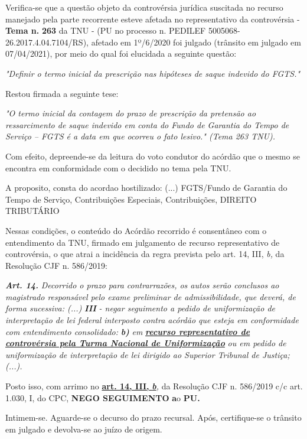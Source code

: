 \documentclass[12pt]{article}
\begin{document}
\justifying
\noindent Verifica-se que a questão objeto da controvérsia jurídica suscitada no recurso manejado pela parte recorrente esteve afetada no representativo da controvérsia - \textbf{Tema n. }\textbf{263} da TNU - (PU no processo n. PEDILEF 5005068-26.2017.4.04.7104/RS),  afetado em 1º/6/2020 foi julgado (trânsito em julgado em 07/04/2021), por meio do qual foi elucidada a seguinte questão:

\noindent \textit{"Definir o termo inicial da prescrição nas hipóteses de saque indevido do FGTS."}

\noindent Restou firmada a seguinte tese:

\noindent \textit{"O termo inicial da contagem do prazo de prescrição da pretensão ao ressarcimento de saque indevido em conta do Fundo de Garantia do Tempo de Serviço – FGTS é a data em que ocorreu o fato lesivo." (Tema 263 TNU).}

\noindent Com efeito, depreende-se da leitura do voto condutor do acórdão que o mesmo se encontra em conformidade com o decidido no  tema pela TNU.

\noindent A proposito, consta do acordao hostilizado: (...) FGTS/Fundo de Garantia do Tempo de Serviço, Contribuições Especiais, Contribuições, DIREITO TRIBUTÁRIO

\noindent Nessas condições, o conteúdo do Acórdão recorrido é consentâneo com o entendimento da TNU, firmado em julgamento de recurso representativo de controvérsia, o que atrai a incidência da regra prevista pelo art. 14, III, \textit{b,} da Resolução CJF n. 586/2019:

\noindent \textit{\textbf{Art. 14.}}\textit{ Decorrido o prazo para contrarrazões, os autos serão conclusos ao magistrado responsável pelo exame preliminar de admissibilidade, que deverá, de forma sucessiva: (...) }\textit{\textbf{III }}\textit{- negar seguimento a pedido de uniformização de interpretação de lei federal interposto contra acórdão que esteja em conformidade com entendimento consolidado: }\textit{\textbf{b)}}\textit{ em }\uline{\textit{\textbf{recurso representativo de controvérsia pela Turma Nacional de Uniformização}}}\textit{ ou em pedido de uniformização de interpretação de lei dirigido ao Superior Tribunal de Justiça;(...).}

\noindent Posto isso, com arrimo no \uline{\textbf{art. 14, III, }}\uline{\textit{\textbf{b}}}\textit{,} da Resolução CJF n. 586/2019 c/c art. 1.030, I, do CPC, \textbf{NEGO SEGUIMENTO }\textbf{a}o\textbf{ PU}\textbf{.}

\noindent Intimem-se. Aguarde-se o decurso do prazo recursal. Após, certifique-se o trânsito em julgado e devolva-se ao juízo de origem.
\end{document}

